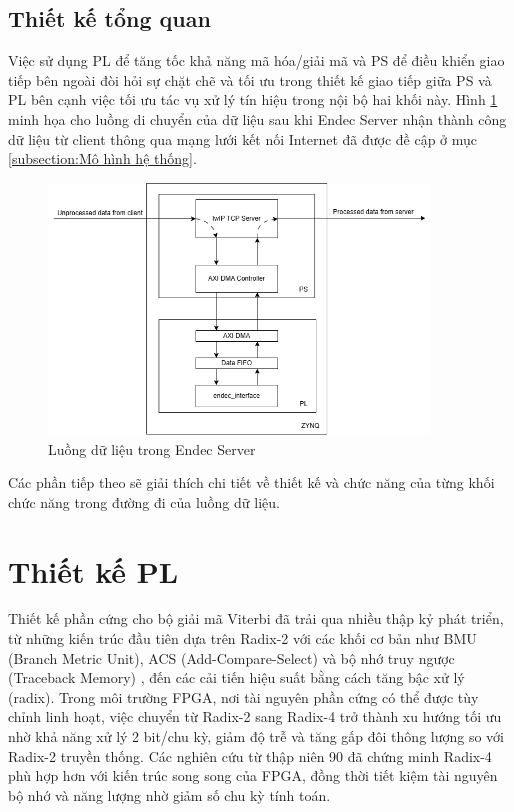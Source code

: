 \documentclass[../DoAn.tex]{subfiles}
\begin{document}
\subsection{Thiết kế tổng quan}

Việc sử dụng PL để tăng tốc khả năng mã hóa/giải mã và PS để điều khiển giao tiếp bên ngoài đòi hỏi sự chặt chẽ và tối ưu trong thiết kế giao tiếp giữa PS và PL bên cạnh việc tối ưu tác vụ xử lý tín hiệu trong nội bộ hai khối này. Hình \ref{fig:Endec Server data flow} minh họa cho luồng di chuyển của dữ liệu sau khi Endec Server nhận thành công dữ liệu từ client thông qua mạng lưới kết nối Internet đã được đề cập ở mục \ref{subsection:Mô hình hệ thống}.

\begin{figure}[H]
    \centering
    \includegraphics[width=0.9\textwidth, height=0.5\textheight, keepaspectratio]{Hinhve/Chuong 4/Endec Server data flow.png}
    \caption{Luồng dữ liệu trong Endec Server}
    \label{fig:Endec Server data flow}
\end{figure}

Các phần tiếp theo sẽ giải thích chi tiết về thiết kế và chức năng của từng khối chức năng trong đường đi của luồng dữ liệu.

\section{Thiết kế PL}

Thiết kế phần cứng cho bộ giải mã Viterbi đã trải qua nhiều thập kỷ phát triển, từ những kiến trúc đầu tiên dựa trên Radix-2 với các khối cơ bản như BMU (Branch Metric Unit), ACS (Add-Compare-Select) và bộ nhớ truy ngược (Traceback Memory) \cite{heller_viterbi_1971}\cite{feygin_survivor_1991}, đến các cải tiến hiệu suất bằng cách tăng bậc xử lý (radix). Trong môi trường FPGA, nơi tài nguyên phần cứng có thể được tùy chỉnh linh hoạt, việc chuyển từ Radix-2 sang Radix-4 trở thành xu hướng tối ưu nhờ khả năng xử lý 2 bit/chu kỳ, giảm độ trễ và tăng gấp đôi thông lượng so với Radix-2 truyền thống. Các nghiên cứu từ thập niên 90 \cite{black_140-mbs_1992} đã chứng minh Radix-4 phù hợp hơn với kiến trúc song song của FPGA, đồng thời tiết kiệm tài nguyên bộ nhớ và năng lượng nhờ giảm số chu kỳ tính toán.
\end{document}
